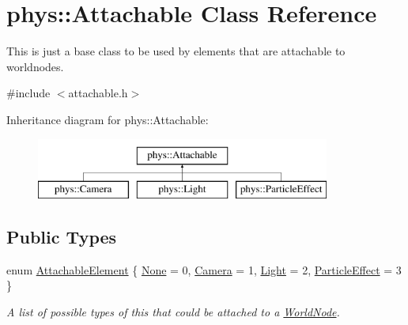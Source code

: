 \hypertarget{classphys_1_1Attachable}{
\section{phys::Attachable Class Reference}
\label{df/dbd/classphys_1_1Attachable}
}


This is just a base class to be used by elements that are attachable to worldnodes.  




{\ttfamily \#include $<$attachable.h$>$}

Inheritance diagram for phys::Attachable:\begin{figure}[H]
\begin{center}
\leavevmode
\includegraphics[height=2.000000cm]{df/dbd/classphys_1_1Attachable}
\end{center}
\end{figure}
\subsection*{Public Types}
\begin{DoxyCompactItemize}
\item 
enum \hyperlink{classphys_1_1Attachable_acd1fca033e7cc0bb3024a92d466d213a}{AttachableElement} \{ \hyperlink{classphys_1_1Attachable_acd1fca033e7cc0bb3024a92d466d213aaca28a2a7b104d463288ef09731c26288}{None} =  0, 
\hyperlink{classphys_1_1Attachable_acd1fca033e7cc0bb3024a92d466d213aa8de5bba9ffca8ba85776e5a54eb26654}{Camera} =  1, 
\hyperlink{classphys_1_1Attachable_acd1fca033e7cc0bb3024a92d466d213aa33e8ea44892e656e8b94e744957c3aff}{Light} =  2, 
\hyperlink{classphys_1_1Attachable_acd1fca033e7cc0bb3024a92d466d213aa5bec8218f7c22f3cf4e54dbcef257657}{ParticleEffect} =  3
 \}
\begin{DoxyCompactList}\small\item\em A list of possible types of this that could be attached to a \hyperlink{classphys_1_1WorldNode}{WorldNode}. \item\end{DoxyCompactList}\end{DoxyCompactItemize}
